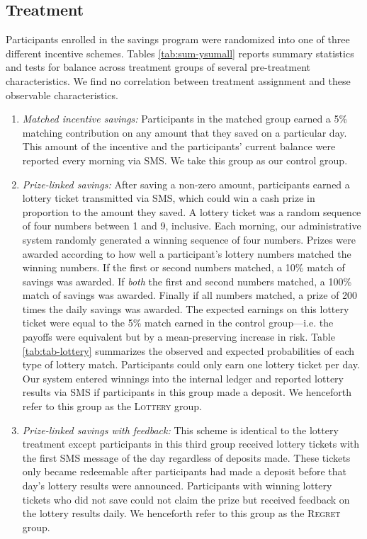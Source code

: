\documentclass[11pt]{article}
\begin{document}
	\subsection{Treatment} \label{sec:treat}

		Participants enrolled in the savings program were randomized into one of three different incentive schemes. Tables \ref{tab:sum-ysumall} reports summary statistics and tests for balance across treatment groups of several pre-treatment characteristics. We find no correlation between treatment assignment and these observable characteristics.

		\begin{enumerate} \setlength{\itemsep}{1pt}

			\item \textit{Matched incentive savings:} Participants in the matched group earned a 5\% matching contribution on any amount that they saved on a particular day. This amount of the incentive and the participants' current balance were reported every morning via SMS. We take this group as our control group.

			\item \textit{Prize-linked savings:} After saving a non-zero amount, participants earned a lottery ticket transmitted via SMS, which could win a cash prize in proportion to the amount they saved. A lottery ticket was a random sequence of four numbers between 1 and 9, inclusive. Each morning, our administrative system randomly generated a winning sequence of four numbers. Prizes were awarded according to how well a participant's lottery numbers matched the winning numbers. If the first or second numbers matched, a 10\% match of savings was awarded. If \emph{both} the first and second numbers matched, a 100\% match of savings was awarded. Finally if all numbers matched, a prize of 200 times the daily savings was awarded. The expected earnings on this lottery ticket were equal to the 5\% match earned in the control group---i.e. the payoffs were equivalent but by a mean-preserving increase in risk. Table \ref{tab:tab-lottery} summarizes the observed and expected probabilities of each type of lottery match. Participants could only earn one lottery ticket per day. Our system entered winnings into the internal ledger and reported lottery results via SMS if participants in this group made a deposit. We henceforth refer to this group as the \textsc{Lottery} group.

			\item \textit{Prize-linked savings with feedback:} This scheme is identical to the lottery treatment except participants in this third group received lottery tickets with the first SMS message of the day regardless of deposits made. These tickets only became redeemable after participants had made a deposit before that day's lottery results were announced. Participants with winning lottery tickets who did not save could not claim the prize but received feedback on the lottery results daily. We henceforth refer to this group as the \textsc{Regret} group.

		\end{enumerate}
\end{document}
